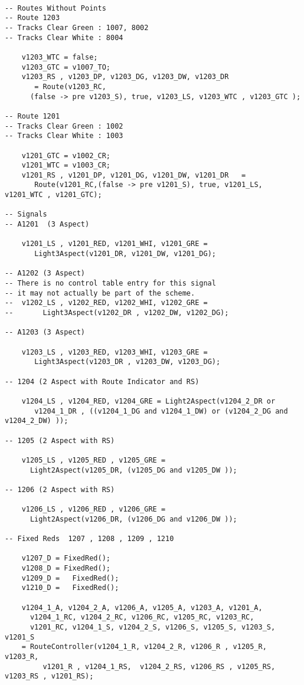 \begin{verbatim}
 
-- Routes Without Points
-- Route 1203
-- Tracks Clear Green : 1007, 8002
-- Tracks Clear White : 8004

	v1203_WTC = false;
	v1203_GTC = v1007_TO; 
	v1203_RS , v1203_DP, v1203_DG, v1203_DW, v1203_DR	
       = Route(v1203_RC, 
      (false -> pre v1203_S), true, v1203_LS, v1203_WTC , v1203_GTC );
	
-- Route 1201
-- Tracks Clear Green : 1002
-- Tracks Clear White : 1003
	
	v1201_GTC = v1002_CR;
	v1201_WTC = v1003_CR;
	v1201_RS , v1201_DP, v1201_DG, v1201_DW, v1201_DR	=
       Route(v1201_RC,(false -> pre v1201_S), true, v1201_LS, v1201_WTC , v1201_GTC);

-- Signals
-- A1201  (3 Aspect)

	v1201_LS , v1201_RED, v1201_WHI, v1201_GRE =
       Light3Aspect(v1201_DR, v1201_DW, v1201_DG);
	
-- A1202 (3 Aspect)
-- There is no control table entry for this signal
-- it may not actually be part of the scheme.
--	v1202_LS , v1202_RED, v1202_WHI, v1202_GRE =
--       Light3Aspect(v1202_DR , v1202_DW, v1202_DG);
	
-- A1203 (3 Aspect)
	
	v1203_LS , v1203_RED, v1203_WHI, v1203_GRE =
       Light3Aspect(v1203_DR , v1203_DW, v1203_DG);
	
-- 1204 (2 Aspect with Route Indicator and RS)
	
	v1204_LS , v1204_RED, v1204_GRE = Light2Aspect(v1204_2_DR or
       v1204_1_DR , ((v1204_1_DG and v1204_1_DW) or (v1204_2_DG and v1204_2_DW) ));
	
-- 1205 (2 Aspect with RS)

	v1205_LS , v1205_RED , v1205_GRE =
      Light2Aspect(v1205_DR, (v1205_DG and v1205_DW ));

-- 1206 (2 Aspect with RS)

	v1206_LS , v1206_RED , v1206_GRE =
      Light2Aspect(v1206_DR, (v1206_DG and v1206_DW ));

-- Fixed Reds  1207 , 1208 , 1209 , 1210

	v1207_D = FixedRed();
	v1208_D = FixedRed();
	v1209_D =	FixedRed();
	v1210_D =	FixedRed();

	v1204_1_A, v1204_2_A, v1206_A, v1205_A, v1203_A, v1201_A, 
      v1204_1_RC, v1204_2_RC, v1206_RC, v1205_RC, v1203_RC, 
      v1201_RC, v1204_1_S, v1204_2_S, v1206_S, v1205_S, v1203_S, v1201_S
	= RouteController(v1204_1_R, v1204_2_R, v1206_R , v1205_R, v1203_R,
         v1201_R , v1204_1_RS,  v1204_2_RS, v1206_RS , v1205_RS, v1203_RS , v1201_RS);


\end{verbatim}
